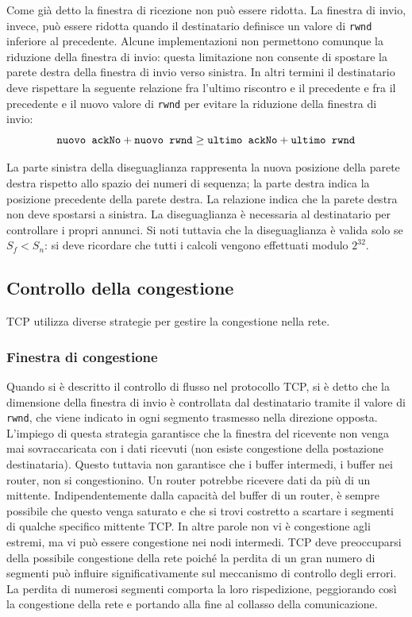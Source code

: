 Come già detto la finestra di ricezione non può essere ridotta. La finestra di invio, invece, può essere ridotta quando il destinatario definisce un valore di \verb|rwnd| inferiore al precedente. Alcune implementazioni non permettono comunque la riduzione della finestra di invio: questa limitazione non consente di spostare la parete destra della finestra di invio verso sinistra. In altri termini il destinatario deve rispettare la seguente relazione fra l'ultimo riscontro e il precedente e fra il precedente e il nuovo valore di \verb|rwnd| per evitare la riduzione della finestra di invio:
\begin{equation*}
    \verb|nuovo ackNo| + \verb|nuovo rwnd| \geq \verb|ultimo ackNo| + \verb|ultimo rwnd|
\end{equation*}

La parte sinistra della diseguaglianza rappresenta la nuova posizione della parete destra rispetto allo spazio dei numeri di sequenza; la parte destra indica la posizione precedente della parete destra. La relazione indica che la parete destra non deve spostarsi a sinistra. La diseguaglianza è necessaria al destinatario per controllare i propri annunci. Si noti tuttavia che la diseguaglianza è valida solo se $S_f<S_n$: si deve ricordare che tutti i calcoli vengono effettuati modulo $2^{32}$.

\subsection{Controllo della congestione}
TCP utilizza diverse strategie per gestire la congestione nella rete.

\subsubsection{Finestra di congestione}
Quando si è descritto il controllo di flusso nel protocollo TCP, si è detto che la dimensione della finestra di invio è controllata dal destinatario tramite il valore di \verb|rwnd|, che viene indicato in ogni segmento trasmesso nella direzione opposta. L'impiego di questa strategia garantisce che la finestra del ricevente non venga mai sovraccaricata con i dati ricevuti (non esiste congestione della postazione destinataria). Questo tuttavia non garantisce che i buffer intermedi, i buffer nei router, non si congestionino. Un router potrebbe ricevere dati da più di un mittente. Indipendentemente dalla capacità del buffer di un router, è sempre possibile che questo venga saturato e che si trovi costretto a scartare i segmenti di qualche specifico mittente TCP. In altre parole non vi è congestione agli estremi, ma vi può essere congestione nei nodi intermedi. TCP deve preoccuparsi della possibile congestione della rete poiché la perdita di un gran numero di segmenti può influire significativamente sul meccanismo di controllo degli errori. La perdita di numerosi segmenti comporta la loro rispedizione, peggiorando così la congestione della rete e portando alla fine al collasso della comunicazione.

